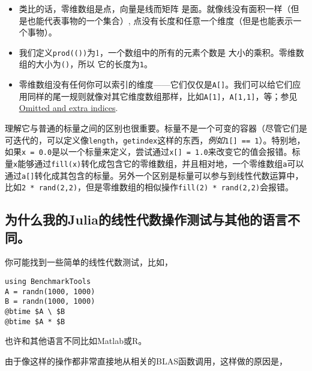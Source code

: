 \begin{itemize}
\item 类比的话，零维数组是{\textquotedbl}点{\textquotedbl}，向量是{\textquotedbl}线{\textquotedbl}而矩阵 是{\textquotedbl}面{\textquotedbl}。就像线没有面积一样（但是也能代表事物的一个集合）, 点没有长度和任意一个维度（但是也能表示一个事物）。


\item 我们定义\texttt{prod(())}为1，一个数组中的所有的元素个数是 大小的乘积。零维数组的大小为\texttt{()}，所以 它的长度为\texttt{1}。


\item 零维数组没有任何你可以索引的维度——它们仅仅是\texttt{A[]}。我们可以给它们应用同样的{\textquotedbl}尾一{\textquotedbl}规则就像对其它维度数组那样，比如\texttt{A[1]}，\texttt{A[1,1]}，等；参见\hyperlink{16741454967402507490}{Omitted and extra indices}.

\end{itemize}


理解它与普通的标量之间的区别也很重要。标量不是一个可变的容器（尽管它们是可迭代的，可以定义像\texttt{length}，\texttt{getindex}这样的东西，\emph{例如}\texttt{1[] == 1}）。特别地，如果\texttt{x = 0.0}是以一个标量来定义，尝试通过\texttt{x[] = 1.0}来改变它的值会报错。标量\texttt{x}能够通过\texttt{fill(x)}转化成包含它的零维数组，并且相对地，一个零维数组\texttt{a}可以通过\texttt{a[]}转化成其包含的标量。另外一个区别是标量可以参与到线性代数运算中，比如\texttt{2 * rand(2,2)}，但是零维数组的相似操作\texttt{fill(2) * rand(2,2)}会报错。



\hypertarget{1475135678057097278}{}


\subsection{为什么我的Julia的线性代数操作测试与其他的语言不同。}



你可能找到一些简单的线性代数测试，比如，




\begin{verbatim}
using BenchmarkTools
A = randn(1000, 1000)
B = randn(1000, 1000)
@btime $A \ $B
@btime $A * $B
\end{verbatim}



也许和其他语言不同比如Matlab或R。



由于像这样的操作都非常直接地从相关的BLAS函数调用，这样做的原因是，



